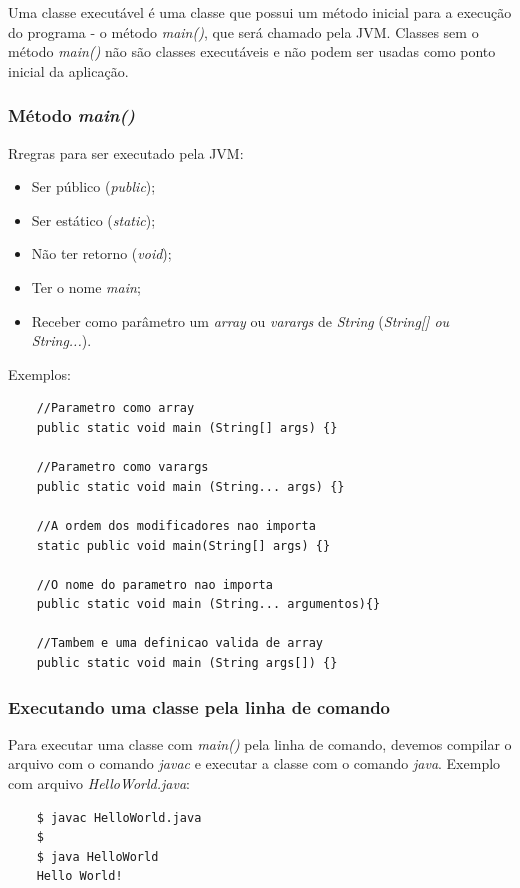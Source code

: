 \documentclass[12pt]{article}
\begin{document}
Uma classe executável é uma classe que possui um método inicial para a execução do programa - o método \textit{main()}, que será chamado pela JVM. Classes sem o método \textit{main()} não são classes executáveis e não podem ser usadas como ponto inicial da aplicação.

\subsubsection{Método \textit{main()}}

Rregras para ser executado pela JVM:
\begin{itemize}
	\item Ser público (\textit{public});
	\item Ser estático (\textit{static});
	\item Não ter retorno (\textit{void});
	\item Ter o nome \textit{main};
	\item Receber como parâmetro um \textit{array} ou \textit{varargs} de \textit{String} (\textit{String[] ou String...}).
\end{itemize}

Exemplos:

\begin{lstlisting}
	//Parametro como array
	public static void main (String[] args) {}
	
	//Parametro como varargs
	public static void main (String... args) {}
	
	//A ordem dos modificadores nao importa
	static public void main(String[] args) {}
	
	//O nome do parametro nao importa
	public static void main (String... argumentos){}
	
	//Tambem e uma definicao valida de array
	public static void main (String args[]) {}
\end{lstlisting}

\subsubsection{Executando uma classe pela linha de comando}

Para executar uma classe com \textit{main()} pela linha de comando, devemos compilar o arquivo com o comando \textit{javac} e executar a classe com o comando \textit{java}. Exemplo com arquivo \textit{HelloWorld.java}:

\begin{lstlisting}
	$ javac HelloWorld.java
	$
	$ java HelloWorld
	Hello World!
\end{lstlisting}
\end{document}
